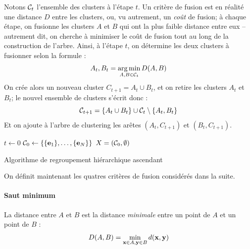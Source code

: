 Notons $\cal{C}_t$ l'ensemble des clusters à l'étape $t$. Un critère de fusion est en réalité une distance $D$ entre les clusters, ou, vu autrement, un \textit{coût} de fusion; à chaque étape, on fusionne les clusters $A$ et $B$ qui ont la plus faible distance entre eux – autrement dit, on cherche à minimiser le coût de fusion tout au long de la construction de l'arbre. Ainsi, à l'étape $t$, on détermine les deux clusters à fusionner selon la formule :
\begin{equation}
    A_t, B_t = \argmin_{A, B \in \cal{C}_t} D(A, B)
\end{equation}
On crée alors un nouveau cluster $C_{t+1} = A_t \cup B_t$, et on retire les clusters $A_t$ et $B_t$; le nouvel ensemble de clusters s'écrit donc :
\begin{equation}
    \cal{C}_{t+1} = \{ A_t \cup B_t \} \cup \cal{C}_t \setminus \{ A_t, B_t \}
\end{equation}
Et on ajoute à l'arbre de clustering les arêtes $(A_t, C_{t+1})$ et $(B_t, C_{t+1})$.



\begin{algorithm}
$t \leftarrow  0$ \;
$\cal{C}_0 \leftarrow  \left\{ \{\bf{e}_1\}, \ldots, \{\bf{e}_N\} \right\}$\;
$X = (\cal{C}_0, \emptyset)$ \;

\caption{Algorithme de regroupement hiérarchique ascendant}
\label{algo:te-clustering}
\end{algorithm}


On définit maintenant les quatres critères de fusion considérés dans la suite. 

\paragraph{Saut minimum}

La distance entre $A$ et $B$ est la distance \textit{minimale} entre un point de $A$ et un point de $B$ :
\begin{equation}
    D(A, B) = \min_{\bf{x} \in A, \bf{y} \in B} d(\bf{x}, \bf{y})
\end{equation}

